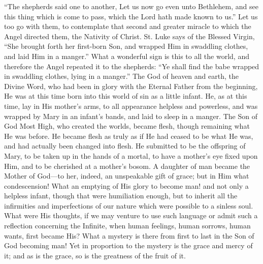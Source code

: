 ``The shepherds said one to another, Let us now go even unto
Bethlehem, and see this thing which is come to pass, which the Lord
hath made known to us.'' Let us too go with them, to contemplate
that second and greater miracle to which the Angel directed them, the
Nativity of Christ. St. Luke says of the Blessed Virgin, ``She
brought forth her first-born Son, and wrapped Him in swaddling
clothes, and laid Him in a manger.'' What a wonderful sign is this
to all the world, and therefore the Angel repeated it to the
shepherds: ``Ye shall find the babe wrapped in swaddling clothes,
lying in a manger.'' The God of heaven and earth, the Divine Word,
who had been in glory with the Eternal Father from the beginning, He
was at this time born into this world of sin as a little infant. He,
as at this time, lay in His mother's arms, to all appearance helpless
and powerless, and was wrapped by Mary in an infant's bands, and laid
to sleep in a manger. The Son of God Most High, who created the
worlds, became flesh, though remaining what He was before. He became
flesh as truly as if He had ceased to be what He was, and had actually
been changed into flesh. He submitted to be the offspring of Mary, to
be taken up in the hands of a mortal, to have a mother's eye fixed
upon Him, and to be cherished at a mother's bosom. A daughter of man
became the Mother of God—to her, indeed, an unspeakable gift of
grace; but in Him what condescension! What an emptying of His glory to
become man! and not only a helpless infant, though that were
humiliation enough, but to inherit all the infirmities and
imperfections of our nature which were possible to a sinless soul.
What were His thoughts, if we may venture to use such language or
admit such a reflection concerning the Infinite, when human feelings,
human sorrows, human wants, first became His? What a mystery is there
from first to last in the Son of God becoming man! Yet in proportion
to the mystery is the grace and mercy of it; and as is the grace, so
is the greatness of the fruit of it.

